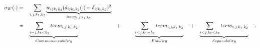 \documentclass[11pt]{article} %
\begin{document}

\begin{align}
\sigma_W(\cdot)  &= & &\sum_{i,j,k_1,k_2} \underbrace{{w_{ij{k_1}{k_2}}(d_{ij{k_1}{k_2}}(\cdot)-\delta_{ijk_1k_2})^2 }}_{term_{i,j,k_1,k_2}} \notag\\
\hspace{3pt} &=& &\underbrace{\sum_{i=j,k_1<k_2}  term_{i,j,k_1,k_2}}_{Commensurability}  \hspace{10pt}  &  + &\hspace{2.5em} \underbrace{\sum_{i<j,k_1=k_2}   term_{i,j,k_1,k_2}  } _{Fidelity}
\hspace{3pt}&+&  &\underbrace{\sum_{i< j,k_1<k_2}  term_{i,j,k_1,k_2}  } _{Separability}\label{eq:FidCommSep}\hspace{10pt} .
\end{align}
\end{document}
